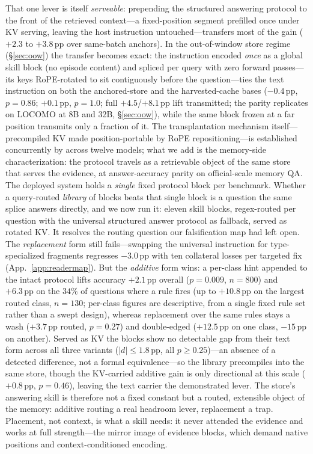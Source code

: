 \documentclass{article} %
\newcommand{\pp}{\,\mathrm{pp}}
\begin{document}
That one lever is itself \emph{serveable}: prepending the structured answering
protocol to the front of the retrieved context---a fixed-position segment prefilled
once under KV serving, leaving the host instruction untouched---transfers most of the
gain ($+2.3$ to $+3.8\pp$ over same-batch anchors). In the out-of-window store regime
(\S\ref{sec:oow}) the transfer becomes exact: the instruction encoded \emph{once} as a
global skill block (no episode content) and spliced per query with zero forward
passes---its keys RoPE-rotated to sit contiguously before the question---ties the text
instruction on both the anchored-store and the harvested-cache bases ($-0.4\pp$,
$p{=}0.86$; $+0.1\pp$, $p{=}1.0$; full $+4.5$/$+8.1\pp$ lift transmitted; the parity
replicates on LOCOMO at 8B and 32B, \S\ref{sec:oow}), while the same
block frozen at a far position transmits only a fraction of it. The transplantation
mechanism itself---precompiled KV made position-portable by RoPE
repositioning---is established concurrently by \citet{kvnotes} across twelve models;
what we add is the memory-side characterization: the protocol travels as a
retrievable object of the same store that serves the evidence, at answer-accuracy
parity on official-scale memory QA. The deployed system holds a \emph{single} fixed protocol
block per benchmark. Whether a query-routed \emph{library} of blocks beats that single
block is a question the same splice answers directly, and we now run it: eleven skill
blocks, regex-routed per question with the universal structured answer protocol as fallback,
served as rotated KV. It resolves the routing question our falsification map had left
open. The \emph{replacement} form still fails---swapping the universal instruction for
type-specialized fragments regresses $-3.0\pp$ with ten collateral losses per targeted
fix (App.~\ref{app:readermap}). But the \emph{additive} form wins: a per-class hint
appended to the intact protocol lifts accuracy $+2.1\pp$ overall ($p{=}0.009$,
$n{=}800$) and $+6.3\pp$ on the $34\%$ of questions where a rule fires (up to $+10.8\pp$
on the largest routed class, $n{=}130$; per-class figures are descriptive, from a single
fixed rule set rather than a swept design), whereas replacement over the same rules stays a
wash ($+3.7\pp$ routed, $p{=}0.27$) and double-edged ($+12.5\pp$ on one class, $-15\pp$ on
another). Served as KV the blocks show no detectable gap from their text form across all
three variants ($|d|{\le}1.8\pp$, all $p{\ge}0.25$)---an absence of a detected difference,
not a formal equivalence---so the library precompiles into the same store, though the
KV-carried additive gain is only directional at this scale ($+0.8\pp$, $p{=}0.46$), leaving
the text carrier the demonstrated lever.
The store's answering skill is therefore not a fixed constant but a routed, extensible
object of the memory: additive routing a real headroom lever, replacement a trap. Placement, not context,
is what a skill needs: it never attended the evidence and works at full strength---the
mirror image of evidence blocks, which demand native positions and context-conditioned
encoding.
\end{document}

